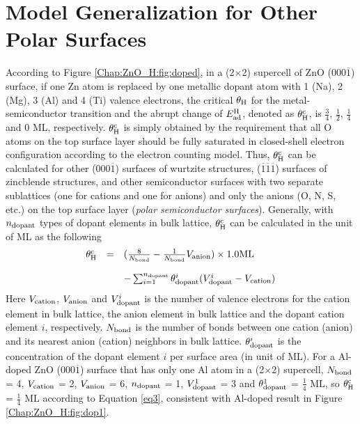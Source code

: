 \section{Model Generalization for Other Polar Surfaces}

According to Figure \ref{Chap:ZnO_H:fig:doped}, in a (2$\times$2) supercell of ZnO (000$\overline{1}$) surface, if one Zn atom is replaced by one metallic dopant atom with 1 (Na), 2 (Mg), 3 (Al) and 4 (Ti) valence electrons, the critical $\theta_{\textup{H}}$ for the metal-semiconductor transition and the abrupt change of $E_{\textup{ad}}^{\textup{H}}$, denoted as  $\theta_{\textup{H}}^{\textup{c}}$, is $\frac{3}{4}$,  $\frac{1}{2}$, $\frac{1}{4}$ and 0 ML, respectively. $\theta_{\textup{H}}^{\textup{c}}$ is simply obtained by the requirement that all O atoms on the top surface layer should be fully saturated in closed-shell electron configuration according to the electron counting model. Thus, $\theta_{\textup{H}}^{\textup{c}}$ can be calculated for other (000$\overline{1}$) surfaces of wurtzite structures, ($\overline{1}$$\overline{1}$$\overline{1}$) surfaces of zincblende structures, and other semiconductor surfaces with two separate sublattices (one for cations and one for anions) and only the anions (O, N, S, etc.) on the top surface layer (\emph{polar semiconductor surfaces}). Generally, with $n_{\textup{dopant}}$ types of dopant elements in bulk lattice, $\theta_{\textup{H}}^{\textup{c}}$ can be calculated in the unit of ML as the following
\begin{equation}
  \begin{array}{rcl}
      \theta_{\textup{H}}^{\textup{c}}&=&(\frac{8}{N_{\textup{bond}}}-\frac{1}{N_{\textup{bond}}}V_{\textup{anion}})\times1.0\textup{ML}\\\\
      &&-\sum_{i=1}^{n_{\textup{dopant}}}\theta_{\textup{dopant}}^i(V_{\textup{dopant}}^i-V_{\textup{cation}})\\
  \end{array}
  \label{eq3}
\end{equation}
Here $V_{\textup{cation}}$, $V_{\textup{anion}}$ and $V_{\textup{dopant}}^i$ is the number of valence electrons for the cation element in bulk lattice, the anion element in bulk lattice and the dopant cation element $i$, respectively. $N_{\textup{bond}}$ is the number of bonds between one cation (anion) and its nearest anion (cation) neighbors in bulk lattice. $\theta_{\textup{dopant}}^i$ is the concentration of the dopant element $i$ per surface area (in unit of ML). For a Al-doped ZnO (000$\overline{1}$) surface that has only one Al atom in a (2$\times$2) supercell, $N_{\textup{bond}}$ = 4, $V_{\textup{cation}}$ = 2, $V_{\textup{anion}}$ = 6, $n_{\textup{dopant}}$ = 1, $V_{\textup{dopant}}^1$ = 3 and $\theta_{\textup{dopant}}^1$ = $\frac{1}{4}$ ML, so $\theta_{\textup{H}}^{\textup{c}}$ = $\frac{1}{4}$ ML according to Equation \ref{eq3}, consistent with Al-doped result in Figure \ref{Chap:ZnO_H:fig:dop1}. 

